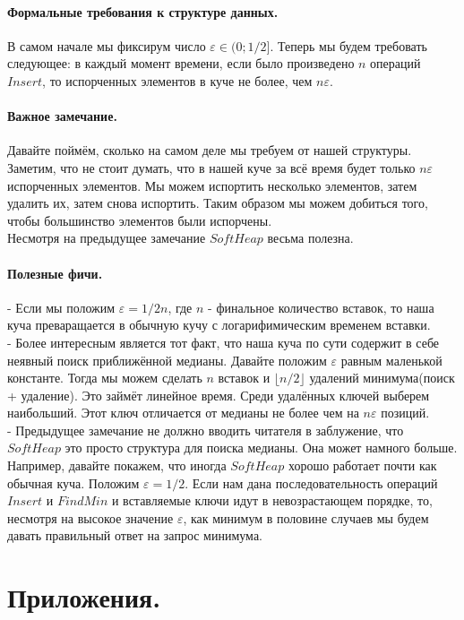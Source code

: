 \documentclass{article}
\begin{document}
		\paragraph{Формальные требования к структуре данных.}
		В самом начале мы фиксирум число $\varepsilon \in (0;1/2]$. Теперь мы будем требовать следующее: в каждый момент времени, если было произведено $n$ операций $Insert$, то испорченных элементов в куче не более, чем $n\varepsilon$.
		\paragraph{Важное замечание.}
		Давайте поймём, сколько на самом деле мы требуем от нашей структуры. Заметим, что не стоит думать, что в нашей куче за всё время будет только $n\varepsilon$ испорченных элементов. Мы можем испортить несколько элементов, затем удалить их, затем снова испортить. Таким образом мы можем добиться того, чтобы большинство элементов были испорчены.\\
		Несмотря на предыдущее замечание $SoftHeap$ весьма полезна.
		\paragraph{Полезные фичи.\\}
		- Если мы положим $\varepsilon = 1/2n$, где $n$ - финальное количество вставок, то наша куча преваращается в обычную кучу с логарифимическим временем вставки.\\
		- Более интересным является тот факт, что наша куча по сути содержит в себе неявный поиск приближённой медианы. Давайте положим $\varepsilon$ равным маленькой константе. Тогда мы можем сделать $n$ вставок и $\lfloor n/2 \rfloor$ удалений минимума(поиск + удаление). Это займёт линейное время. Среди удалённых ключей выберем наибольший. Этот ключ отличается от медианы не более чем на $n\varepsilon$ позиций.\\
		- Предыдущее замечание не должно вводить читателя в заблужение, что $SoftHeap$ это просто структура для поиска медианы. Она может намного больше. Например, давайте покажем, что иногда $SoftHeap$ хорошо работает почти как обычная куча. Положим $\varepsilon = 1/2$. Если нам дана последовательность операций $Insert$ и $FindMin$ и вставляемые ключи идут в невозрастающем порядке, то, несмотря на высокое значение $\varepsilon$, как минимум в половине случаев мы будем давать правильный ответ на запрос минимума.
	\section{Приложения.}
\end{document}
